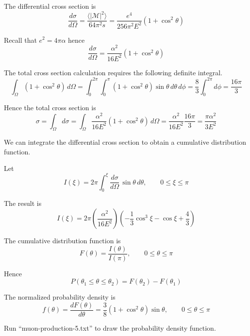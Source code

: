 \documentclass[12pt]{article}
\begin{document}
\noindent
The differential cross section is
$$
\frac{d\sigma}{d\Omega}
=\frac{\langle|\mathcal{M}|^2\rangle}{64\pi^2s}
=\frac{e^4}{256\pi^2E^2}(1+\cos^2\theta)
$$

\noindent
Recall that $e^2=4\pi\alpha$ hence
\begin{equation*}
\frac{d\sigma}{d\Omega}=\frac{\alpha^2}{16E^2}(1+\cos^2\theta)
\end{equation*}

\noindent
The total cross section calculation requires the following definite integral.
$$
\int_\Omega(1+\cos^2\theta)\,d\Omega
=\int_0^{2\pi}\int_0^\pi(1+\cos^2\theta)\sin\theta\,d\theta\,d\phi
=\frac{8}{3}\int_0^{2\pi}d\phi
=\frac{16\pi}{3}
$$

\noindent
Hence the total cross section is
$$
\sigma
=\int_\Omega d\sigma
=\int_\Omega\frac{\alpha^2}{16E^2}(1+\cos^2\theta)\,d\Omega
=\frac{\alpha^2}{16E^2}\frac{16\pi}{3}
=\frac{\pi\alpha^2}{3E^2}
$$

\newpage
\noindent
We can integrate the differential cross section to obtain a cumulative distribution function.

\bigskip
\noindent
Let
\begin{equation*}
I(\xi)=2\pi\int_0^\xi\frac{d\sigma}{d\Omega}\,\sin\theta\,d\theta,
\qquad0\le\xi\le\pi
\end{equation*}

\noindent
The result is
\begin{equation*}
I(\xi)=2\pi\left(\frac{\alpha^2}{16E^2}\right)
\left(-\frac{1}{3}\cos^3\xi-\cos\xi+\frac{4}{3}\right)
\end{equation*}

\noindent
The cumulative distribution function is
\begin{equation*}
F(\theta)=\frac{I(\theta)}{I(\pi)},\qquad0\le\theta\le\pi
\end{equation*}

\noindent
Hence
\begin{equation*}
P(\theta_1\le\theta\le\theta_2)=F(\theta_2)-F(\theta_1)
\end{equation*}

\noindent
The normalized probability density is
\begin{equation*}
f(\theta)=\frac{dF(\theta)}{d\theta}=\frac{3}{8}(1+\cos^2\theta)\sin\theta,
\qquad0\le\theta\le\pi
\end{equation*}

\noindent
Run ``muon-production-5.txt'' to draw the probability density function.
\end{document}
